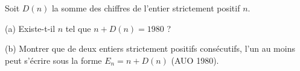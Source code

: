 Soit $D(n)$ la somme des chiffres de l'entier strictement positif $n$.

(a) Existe-t-il $n$ tel que $n + D(n) = 1980$ ?

(b) Montrer que de deux entiers strictement positifs consécutifs, l'un au moins peut s'écrire sous la forme $E_n = n + D(n)$ (AUO 1980).
